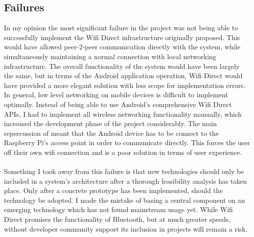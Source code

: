 \documentclass{article}
\begin{document}
\subsection{Failures}
In my opinion the most significant failure in the project was not being able to successfully implement the Wifi Direct infrastructure originally proposed. This would have allowed peer-2-peer communication directly with the system, while simultaneously maintaining a normal connection with local networking infrastructure. The overall functionality of the system would have been largely the same, but in terms of the Android application operation, Wifi Direct would have provided a more elegant solution with less scope for implementation errors. In general, low level networking on mobile devices is difficult to implement optimally. Instead of being able to use Android\rq s comprehensive Wifi Direct APIs, I had to implement all wireless networking functionality manually, which increased the development phase of the project considerably. The main repercussion of meant that the Android device has to be connect to the Raspberry Pi\rq s access point in order to communicate directly. This forces the user off their own wifi connection and is a poor solution in terms of user experience. \\\\
Something I took away from this failure is that new technologies should only be included in a system\rq s architecture after a thorough feasibility analysis has taken place. Only after a concrete prototype has been implemented, should the technology be adopted. I made the mistake of basing a central component on an emerging technology which has not found mainstream usage yet. While Wifi Direct promises the functionality of Bluetooth, but at much greater speeds, without developer community support its inclusion in projects will remain a risk. 
\end{document}
